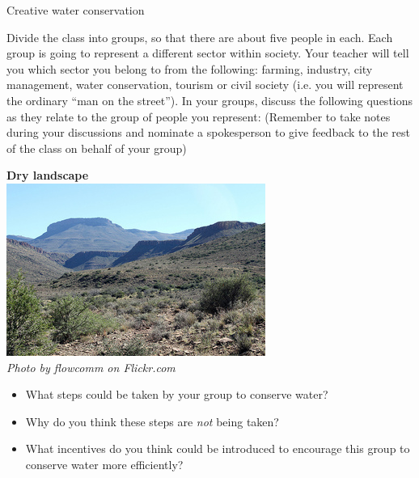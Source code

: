             \begin{groupdiscussion}{ Creative water conservation}
            \nopagebreak
\begin{minipage}{.6\textwidth}
    Divide the class into groups, so that there are about five people in each. Each group is going to represent a different sector within society. Your teacher will tell you which sector you belong to from the following: farming, industry, city management, water conservation, tourism or civil society (i.e.\@{} you will represent the ordinary ``man on the street''). In your groups, discuss the following questions as they relate to the group of people you represent: (Remember to take notes during your discussions and nominate a spokesperson to give feedback to the rest of the class on behalf of your group)
\end{minipage}
\begin{minipage}{.4\textwidth}
 \begin{center}
\textbf{Dry landscape}\\
  \includegraphics[width=.6\textwidth]{photos/karoo_flowcomm.jpg} \\
\textsl{Photo by flowcomm on Flickr.com}
 \end{center}

\end{minipage}
\label{m38138*id342317}\begin{itemize}[noitemsep]
            \label{m38138*uid88}\item What steps could be taken by your group to conserve water?
\label{m38138*uid89}\item Why do you think these steps are \textsl{not} being taken?
\label{m38138*uid90}\item What incentives do you think could be introduced to encourage this group to conserve water more efficiently?
\end{itemize}


\end{groupdiscussion}
\par 
